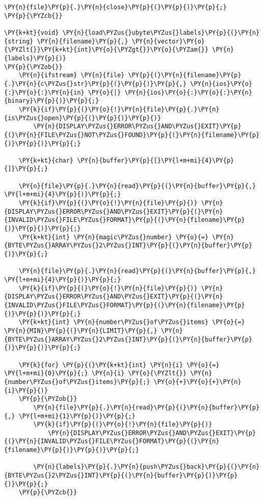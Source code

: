\begin{Verbatim}[commandchars=\\\{\}]
	\PY{n}{file}\PY{p}{.}\PY{n}{close}\PY{p}{(}\PY{p}{)}\PY{p}{;}
\PY{p}{\PYZcb{}}

\PY{k+kt}{void} \PY{n}{load\PYZus{}ubyte\PYZus{}labels}\PY{p}{(}\PY{n}{string} \PY{n}{filename}\PY{p}{,} \PY{n}{vector}\PY{o}{\PYZlt{}}\PY{k+kt}{int}\PY{o}{\PYZgt{}}\PY{o}{\PYZam{}} \PY{n}{labels}\PY{p}{)}
\PY{p}{\PYZob{}}
	\PY{n}{ifstream} \PY{n}{file} \PY{p}{(}\PY{n}{filename}\PY{p}{.}\PY{n}{c\PYZus{}str}\PY{p}{(}\PY{p}{)}\PY{p}{,} \PY{n}{ios}\PY{o}{:}\PY{o}{:}\PY{n}{in} \PY{o}{|} \PY{n}{ios}\PY{o}{:}\PY{o}{:}\PY{n}{binary}\PY{p}{)}\PY{p}{;}
	\PY{k}{if}\PY{p}{(}\PY{o}{!}\PY{n}{file}\PY{p}{.}\PY{n}{is\PYZus{}open}\PY{p}{(}\PY{p}{)}\PY{p}{)}
		\PY{n}{DISPLAY\PYZus{}ERROR\PYZus{}AND\PYZus{}EXIT}\PY{p}{(}\PY{n}{FILE\PYZus{}NOT\PYZus{}FOUND}\PY{p}{(}\PY{n}{filename}\PY{p}{)}\PY{p}{)}\PY{p}{;}
	
	\PY{k+kt}{char} \PY{n}{buffer}\PY{p}{[}\PY{l+m+mi}{4}\PY{p}{]}\PY{p}{;}

	\PY{n}{file}\PY{p}{.}\PY{n}{read}\PY{p}{(}\PY{n}{buffer}\PY{p}{,} \PY{l+m+mi}{4}\PY{p}{)}\PY{p}{;}
	\PY{k}{if}\PY{p}{(}\PY{o}{!}\PY{n}{file}\PY{p}{)} \PY{n}{DISPLAY\PYZus{}ERROR\PYZus{}AND\PYZus{}EXIT}\PY{p}{(}\PY{n}{INVALID\PYZus{}FILE\PYZus{}FORMAT}\PY{p}{(}\PY{n}{filename}\PY{p}{)}\PY{p}{)}\PY{p}{;}
	\PY{k+kt}{int} \PY{n}{magic\PYZus{}number} \PY{o}{=} \PY{n}{BYTE\PYZus{}ARRAY\PYZus{}2\PYZus{}INT}\PY{p}{(}\PY{n}{buffer}\PY{p}{)}\PY{p}{;}

	\PY{n}{file}\PY{p}{.}\PY{n}{read}\PY{p}{(}\PY{n}{buffer}\PY{p}{,} \PY{l+m+mi}{4}\PY{p}{)}\PY{p}{;}
	\PY{k}{if}\PY{p}{(}\PY{o}{!}\PY{n}{file}\PY{p}{)} \PY{n}{DISPLAY\PYZus{}ERROR\PYZus{}AND\PYZus{}EXIT}\PY{p}{(}\PY{n}{INVALID\PYZus{}FILE\PYZus{}FORMAT}\PY{p}{(}\PY{n}{filename}\PY{p}{)}\PY{p}{)}\PY{p}{;}
	\PY{k+kt}{int} \PY{n}{number\PYZus{}of\PYZus{}items} \PY{o}{=} \PY{n}{MIN}\PY{p}{(}\PY{n}{LIMIT}\PY{p}{,} \PY{n}{BYTE\PYZus{}ARRAY\PYZus{}2\PYZus{}INT}\PY{p}{(}\PY{n}{buffer}\PY{p}{)}\PY{p}{)}\PY{p}{;}

	\PY{k}{for} \PY{p}{(}\PY{k+kt}{int} \PY{n}{i} \PY{o}{=} \PY{l+m+mi}{0}\PY{p}{;} \PY{n}{i} \PY{o}{\PYZlt{}} \PY{n}{number\PYZus{}of\PYZus{}items}\PY{p}{;} \PY{o}{+}\PY{o}{+}\PY{n}{i}\PY{p}{)}
	\PY{p}{\PYZob{}}
		\PY{n}{file}\PY{p}{.}\PY{n}{read}\PY{p}{(}\PY{n}{buffer}\PY{p}{,} \PY{l+m+mi}{1}\PY{p}{)}\PY{p}{;}
		\PY{k}{if}\PY{p}{(}\PY{o}{!}\PY{n}{file}\PY{p}{)}
			\PY{n}{DISPLAY\PYZus{}ERROR\PYZus{}AND\PYZus{}EXIT}\PY{p}{(}\PY{n}{INVALID\PYZus{}FILE\PYZus{}FORMAT}\PY{p}{(}\PY{n}{filename}\PY{p}{)}\PY{p}{)}\PY{p}{;}

		\PY{n}{labels}\PY{p}{.}\PY{n}{push\PYZus{}back}\PY{p}{(}\PY{n}{BYTE\PYZus{}2\PYZus{}INT}\PY{p}{(}\PY{n}{buffer}\PY{p}{)}\PY{p}{)}\PY{p}{;}
	\PY{p}{\PYZcb{}}


\end{Verbatim}
